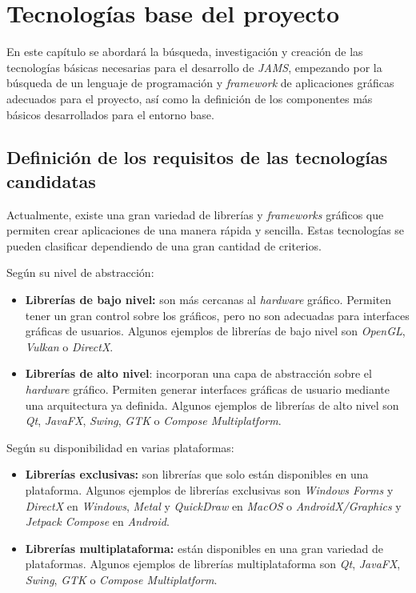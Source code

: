 \chapter{Tecnologías base del proyecto}\label{ch:tecnologias-base-del-proyecto}

En este capítulo se abordará la búsqueda, investigación y creación de las tecnologías
básicas necesarias para el desarrollo de \textit{JAMS}, empezando por la búsqueda
de un lenguaje de programación y \textit{framework} de aplicaciones gráficas adecuados
para el proyecto, así como la definición de los componentes más básicos desarrollados
para el entorno base.

\section{Definición de los requisitos de las tecnologías candidatas}
\label{sec:definicion-requisitos-tecnologías-candidatas}

Actualmente, existe una gran variedad de librerías y \textit{frameworks} gráficos que permiten
crear aplicaciones de una manera rápida y sencilla.
Estas tecnologías se pueden clasificar dependiendo de una gran cantidad de criterios.

Según su nivel de abstracción:
\begin{itemize}
    \item \textbf{Librerías de bajo nivel:} son más cercanas al \textit{hardware} gráfico.
    Permiten tener un gran control sobre los gráficos, pero no son adecuadas para
    interfaces gráficas de usuarios.
    Algunos ejemplos de librerías de bajo nivel son \textit{OpenGL}\cite{OPENGL},
    \textit{Vulkan}\cite{VULKAN} o \textit{DirectX}\cite{DIRECTX}.
    \item \textbf{Librerías de alto nivel}: incorporan una capa de abstracción sobre el \textit{hardware} gráfico.
    Permiten generar interfaces gráficas de usuario mediante una arquitectura ya definida.
    Algunos ejemplos de librerías de alto nivel son \textit{Qt}\cite{QT},
    \textit{JavaFX}\cite{JAVAFX}, \textit{Swing}\cite{SWING}, \textit{GTK} o
    \textit{Compose Multiplatform}\cite{COMPOSE}.
\end{itemize}

Según su disponibilidad en varias plataformas:
\begin{itemize}
    \item \textbf{Librerías exclusivas:} son librerías que solo están disponibles en una plataforma.
    Algunos ejemplos de librerías exclusivas son \textit{Windows Forms}\cite{WINDOWSFORMS}
    y \textit{DirectX} en \textit{Windows},
    \textit{Metal} y \textit{QuickDraw} en \textit{MacOS}
    o \textit{AndroidX/Graphics} y \textit{Jetpack Compose}\cite{COMPOSE}
    en \textit{Android}.
    \item \textbf{Librerías multiplataforma:} están disponibles en una gran variedad de plataformas.
    Algunos ejemplos de librerías multiplataforma son \textit{Qt}, \textit{JavaFX}, \textit{Swing}, \textit{GTK}
    o \textit{Compose Multiplatform}.
\end{itemize}

